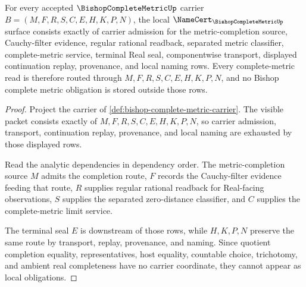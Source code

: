 \begin{theorem}
\label{thm:bishop-complete-metric-namecert-obligations}
For every accepted $\BishopCompleteMetricUp$ carrier $B=(M,F,R,S,C,E,H,K,P,N)$, the local $\NameCert_{\BishopCompleteMetricUp}$ surface consists exactly of carrier admission for the metric-completion source, Cauchy-filter evidence, regular rational readback, separated metric classifier, complete-metric service, terminal Real seal, componentwise transport, displayed continuation replay, provenance, and local naming rows. Every complete-metric read is therefore routed through $M,F,R,S,C,E,H,K,P,N$, and no Bishop complete metric obligation is stored outside those rows.
\end{theorem}
\begin{proof}
Project the carrier of \autoref{def:bishop-complete-metric-carrier}. The visible packet consists exactly of $M,F,R,S,C,E,H,K,P,N$, so carrier admission, transport, continuation replay, provenance, and local naming are exhausted by those displayed rows.

Read the analytic dependencies in dependency order. The metric-completion source $M$ admits the completion route, $F$ records the Cauchy-filter evidence feeding that route, $R$ supplies regular rational readback for Real-facing observations, $S$ supplies the separated zero-distance classifier, and $C$ supplies the complete-metric limit service.

The terminal seal $E$ is downstream of those rows, while $H,K,P,N$ preserve the same route by transport, replay, provenance, and naming. Since quotient completion equality, representatives, host equality, countable choice, trichotomy, and ambient real completeness have no carrier coordinate, they cannot appear as local obligations.
\end{proof}

